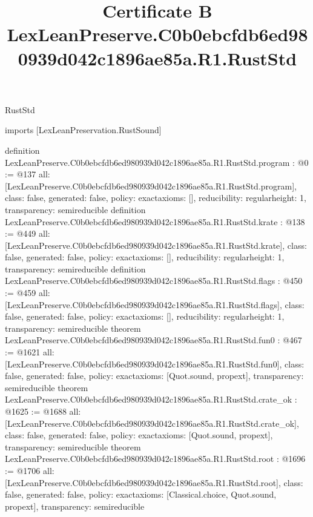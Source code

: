 \begin{lexlean}{RustStd}
\title{Certificate B LexLeanPreserve.C0b0ebcfdb6ed980939d042c1896ae85a.R1.RustStd}
\begin{coremodule}
imports [LexLeanPreservation.RustSound]

definition LexLeanPreserve.C0b0ebcfdb6ed980939d042c1896ae85a.R1.RustStd.program : @0 := @137 {
  all: [LexLeanPreserve.C0b0ebcfdb6ed980939d042c1896ae85a.R1.RustStd.program],
  class: false,
  generated: false,
  policy: exact{axioms: []},
  reducibility: regular{height: 1},
  transparency: semireducible
}
definition LexLeanPreserve.C0b0ebcfdb6ed980939d042c1896ae85a.R1.RustStd.krate : @138 := @449 {
  all: [LexLeanPreserve.C0b0ebcfdb6ed980939d042c1896ae85a.R1.RustStd.krate],
  class: false,
  generated: false,
  policy: exact{axioms: []},
  reducibility: regular{height: 1},
  transparency: semireducible
}
definition LexLeanPreserve.C0b0ebcfdb6ed980939d042c1896ae85a.R1.RustStd.flags : @450 := @459 {
  all: [LexLeanPreserve.C0b0ebcfdb6ed980939d042c1896ae85a.R1.RustStd.flags],
  class: false,
  generated: false,
  policy: exact{axioms: []},
  reducibility: regular{height: 1},
  transparency: semireducible
}
theorem LexLeanPreserve.C0b0ebcfdb6ed980939d042c1896ae85a.R1.RustStd.fun0 : @467 := @1621 {
  all: [LexLeanPreserve.C0b0ebcfdb6ed980939d042c1896ae85a.R1.RustStd.fun0],
  class: false,
  generated: false,
  policy: exact{axioms: [Quot.sound, propext]},
  transparency: semireducible
}
theorem LexLeanPreserve.C0b0ebcfdb6ed980939d042c1896ae85a.R1.RustStd.crate_ok : @1625 := @1688 {
  all: [LexLeanPreserve.C0b0ebcfdb6ed980939d042c1896ae85a.R1.RustStd.crate_ok],
  class: false,
  generated: false,
  policy: exact{axioms: [Quot.sound, propext]},
  transparency: semireducible
}
theorem LexLeanPreserve.C0b0ebcfdb6ed980939d042c1896ae85a.R1.RustStd.root : @1696 := @1706 {
  all: [LexLeanPreserve.C0b0ebcfdb6ed980939d042c1896ae85a.R1.RustStd.root],
  class: false,
  generated: false,
  policy: exact{axioms: [Classical.choice, Quot.sound, propext]},
  transparency: semireducible
}


\end{coremodule}
\end{lexlean}
